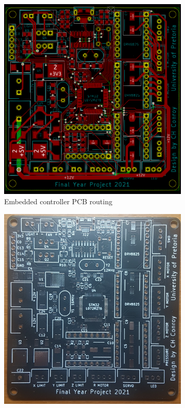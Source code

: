 \begin{figure}[!ht]
	\centering
	\begin{subfigure}{.5\textwidth}
		\centering
		\includegraphics[width=1\linewidth]{figures/pcb-routing.png}
		\caption{Embedded controller PCB routing}
		\label{fig:pcb-routing}
	\end{subfigure}%
	\begin{subfigure}{.5\textwidth}
		\centering
		\includegraphics[width=1\linewidth]{figures/pcb-board.jpg}

\end{subfigure}
\end{figure}
